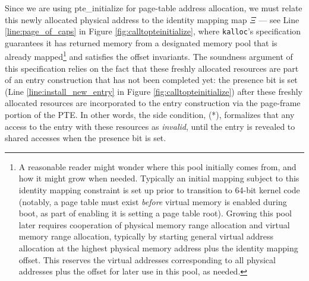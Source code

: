 Since we are using \textsf{pte\_initialize} for page-table address allocation, we must relate this newly
allocated physical address to the identity mapping map $\Xi$ --- 
see Line \ref{line:page_of_caps} in Figure \ref{fig:calltopteinitialize}, where
\texttt{kalloc}'s specification guarantees it has returned memory from a designated memory
pool that is already mapped\footnote{A reasonable reader might wonder where this pool
initially comes from, and how it might grow when needed. Typically an initial mapping subject to this identity mapping
constraint is set up prior to transition to 64-bit kernel code (notably,
a page table must exist \emph{before} virtual memory is enabled during boot, as part of enabling it is setting
a page table root).
Growing this pool later requires cooperation of physical memory range allocation and virtual memory range allocation,
typically by starting general virtual address allocation at the highest physical memory address plus the identity mapping offset.
This reserves the virtual addresses corresponding to all physical addresses plus the offset for later use in this pool,
as needed.
} and satisfies the offset invariants.
The soundness argument of this specification relies on the fact that these freshly allocated resources are part 
of an entry construction that has not been completed yet: the presence bit is set 
(Line \ref{line:install_new_entry} in Figure \ref{fig:calltopteinitialize}) after these freshly allocated resources are incorporated to the 
entry construction via the page-frame portion of the PTE. In other words, the side condition, (*),
 formalizes that any access to the entry with these resources as \textit{invalid}, until the entry is revealed to 
shared accesses when the presence bit is set. 

